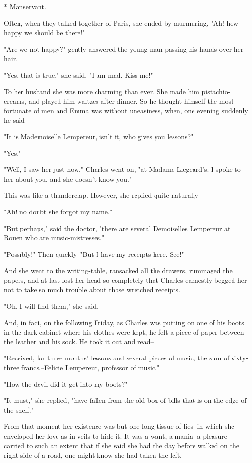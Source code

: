 \documentclass[11pt,twocolumn]{ltugboat}
\begin{document}
     * Manservant.


Often, when they talked together of Paris, she ended by murmuring, "Ah!
how happy we should be there!"

"Are we not happy?" gently answered the young man passing his hands over
her hair.

"Yes, that is true," she said. "I am mad. Kiss me!"

To her husband she was more charming than ever. She made him
pistachio-creams, and played him waltzes after dinner. So he thought
himself the most fortunate of men and Emma was without uneasiness, when,
one evening suddenly he said--

"It is Mademoiselle Lempereur, isn't it, who gives you lessons?"

"Yes."

"Well, I saw her just now," Charles went on, "at Madame Liegeard's. I
spoke to her about you, and she doesn't know you."

This was like a thunderclap. However, she replied quite naturally--

"Ah! no doubt she forgot my name."

"But perhaps," said the doctor, "there are several Demoiselles Lempereur
at Rouen who are music-mistresses."

"Possibly!" Then quickly--"But I have my receipts here. See!"

And she went to the writing-table, ransacked all the drawers, rummaged
the papers, and at last lost her head so completely that Charles
earnestly begged her not to take so much trouble about those wretched
receipts.

"Oh, I will find them," she said.

And, in fact, on the following Friday, as Charles was putting on one
of his boots in the dark cabinet where his clothes were kept, he felt
a piece of paper between the leather and his sock. He took it out and
read--

"Received, for three months' lessons and several pieces of music, the
sum of sixty-three francs.--Felicie Lempereur, professor of music."

"How the devil did it get into my boots?"

"It must," she replied, "have fallen from the old box of bills that is
on the edge of the shelf."

From that moment her existence was but one long tissue of lies, in which
she enveloped her love as in veils to hide it. It was a want, a mania,
a pleasure carried to such an extent that if she said she had the day
before walked on the right side of a road, one might know she had taken
the left.
\end{document}

